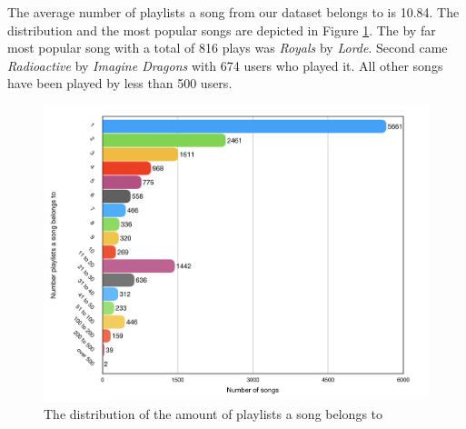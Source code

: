 The average number of playlists a song from our dataset belongs to is 10.84. The distribution and the most popular songs are depicted in Figure \ref{fig:popular_song_distribution}. The by far most popular song with a total of 816 plays was \textit{Royals} by \textit{Lorde}. Second came \textit{Radioactive} by \textit{Imagine Dragons} with 674 users who played it. All other songs have been played by less than 500 users.

\begin{figure}[ht]
    \centering
	\includegraphics[width=0.8\linewidth]{./img/times_played_numbers2.png}
	\caption{The distribution of the amount of playlists a song belongs to}
	\label{fig:popular_song_distribution}
\end{figure}


